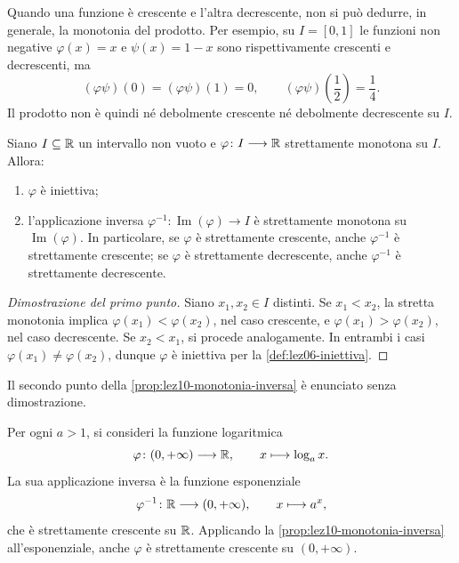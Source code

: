 Quando una funzione è crescente e l'altra decrescente,
non si può dedurre, in generale, la monotonia del prodotto.
Per esempio, su \(I=[0,1]\) le funzioni non negative
\(\varphi(x)=x\) e \(\psi(x)=1-x\) sono rispettivamente
crescenti e decrescenti, ma
\[
  (\varphi\psi)(0)=(\varphi\psi)(1)=0,
  \qquad
  (\varphi\psi)\!\left(\frac12\right)=\frac14.
\]
Il prodotto non è quindi né debolmente crescente
né debolmente decrescente su \(I\).

\clearpage

\begin{proposition}
\label{prop:lez10-monotonia-inversa}
Siano \(I\subseteq\mathbb{R}\) un intervallo non vuoto e
\(\varphi\colon I\longrightarrow\mathbb{R}\) strettamente monotona su \(I\).
Allora:
\begin{enumerate}
  \item \(\varphi\) è iniettiva;
  \item l'applicazione inversa
  \(\varphi^{-1}\colon\operatorname{Im}(\varphi)\longrightarrow I\)
  è strettamente monotona su \(\operatorname{Im}(\varphi)\).
  In particolare, se \(\varphi\) è strettamente crescente,
  anche \(\varphi^{-1}\) è strettamente crescente;
  se \(\varphi\) è strettamente decrescente,
  anche \(\varphi^{-1}\) è strettamente decrescente.
\end{enumerate}
\end{proposition}

\begin{proof}[Dimostrazione del primo punto]
Siano \(x_1,x_2\in I\) distinti.
Se \(x_1<x_2\), la stretta monotonia implica
\(\varphi(x_1)<\varphi(x_2)\), nel caso crescente, e
\(\varphi(x_1)>\varphi(x_2)\), nel caso decrescente.
Se \(x_2<x_1\), si procede analogamente.
In entrambi i casi \(\varphi(x_1)\ne\varphi(x_2)\),
dunque \(\varphi\) è iniettiva per la
\cref{def:lez06-iniettiva}.
\end{proof}

Il secondo punto della \cref{prop:lez10-monotonia-inversa}
è enunciato senza dimostrazione.

\begin{example}
\label{ex:lez10-logaritmo-monotono}
Per ogni \(a>1\), si consideri la funzione logaritmica
\[
  \varphi\colon(0,+\infty)\longrightarrow\mathbb{R},
  \qquad x\longmapsto\log_a x.
\]
La sua applicazione inversa è la funzione esponenziale
\[
  \varphi^{-1}\colon\mathbb{R}\longrightarrow(0,+\infty),
  \qquad x\longmapsto a^x,
\]
che è strettamente crescente su \(\mathbb{R}\).
Applicando la \cref{prop:lez10-monotonia-inversa}
all'esponenziale, anche \(\varphi\) è strettamente
crescente su \((0,+\infty)\).
\end{example}
